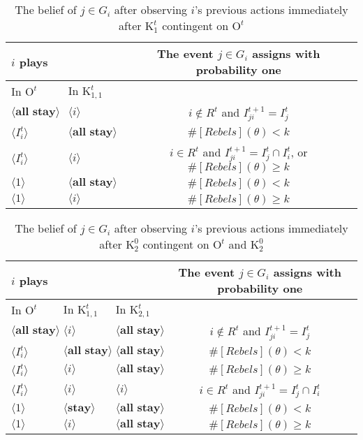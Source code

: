 \documentclass[12pt,letter]{article}
\newcommand{\Kappa}{\mathrm{K}}
\newcommand{\Omicron}{\mathrm{O}}
\theoremstyle{definition}
\theoremstyle{remark}
\theoremstyle{claim}
\begin{document}
\begin{table}[!htbp]
\caption{The belief of $j\in G_i$ after observing $i$'s previous actions immediately after $\Kappa^t_1$ {contingent} on $\Omicron^t$ }
\label{Table_blf_up_cdt1}
\begin{center}
\begin{tabular}{l  l | c}
 $i$ plays	&			  & The event $j\in G_i$ assigns with probability one \\
\hline
\hline
	  In $\Omicron^t$	 	&		In $\Kappa^t_{1,1}$	&				  \\
\hline
$\langle \textbf{all stay} \rangle$  & $\langle i \rangle$	&    $i\notin R^t$ and $I^{t+1}_{ji}=I^t_j$  \\
$\langle I^t_{i} \rangle$  & $\langle \textbf{all stay} \rangle$	&    $\#[Rebels](\theta)< k$ \\
$\langle I^t_{i} \rangle$  & $\langle i \rangle$	&    $i\in R^t$ and $I^{t+1}_{ji}=I^t_j\cap I^t_{i}$,  or $\#[Rebels](\theta)\geq k$ \\
$\langle 1 \rangle$  & $\langle \textbf{all stay} \rangle$	&	  $\#[Rebels](\theta)< k$    \\
$\langle 1 \rangle$  & $\langle i \rangle$	&	  $\#[Rebels](\theta)\geq k$  \\
  \hline
\end{tabular}
\end{center}
\end{table}

\begin{table}[!htbp]
\caption{The belief of $j\in G_i$ after observing $i$'s previous actions immediately after $\Kappa^0_{2}$ {contingent} on $\Omicron^t$ and $\Kappa^0_{2}$ }
\label{Table_blf_up_cdt2}
\begin{center}
\begin{tabular}{l  l l | c}
 $i$ plays  	&		&  	  &The event $j\in G_i$ assigns with probability one\\
\hline
\hline
In $\Omicron^t$			&	In $\Kappa^t_{1,1}$			&			In $\Kappa^t_{2,1}$		&   \\
\hline
$\langle \textbf{all stay} \rangle$  & $\langle i \rangle$	&  $\langle \textbf{all stay} \rangle$ &  $i\notin R^t$ and $I^{t+1}_{ji}=I^t_j$  \\
$\langle I^t_{i} \rangle$  & $\langle \textbf{all stay} \rangle$	&  $\langle \textbf{all stay} \rangle$ &  $\#[Rebels](\theta)< k$ \\
$\langle I^t_{i} \rangle$  & $\langle i \rangle$	&  $\langle \textbf{all stay} \rangle$ &  $\#[Rebels](\theta)\geq k$ \\
$\langle I^t_{i} \rangle$  & $\langle i \rangle$	&  $\langle i \rangle$ &  $i\in R^t$ and $I^{t+1}_{ji}=I^t_j\cap I^t_{i}$ \\
$\langle 1 \rangle$  & $\langle \textbf{stay} \rangle$	&	$\langle \textbf{all stay} \rangle$ &  $\#[Rebels](\theta)< k$    \\
$\langle 1 \rangle$  & $\langle i \rangle$	&	$\langle \textbf{all stay} \rangle$ &  $\#[Rebels](\theta)\geq k$  \\
  \hline
\end{tabular}
\end{center}
\end{table}
\end{document}
